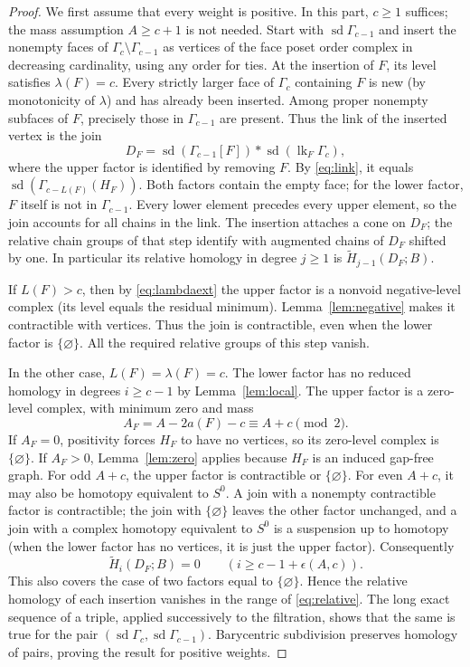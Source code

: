 \documentclass[11pt,a4paper]{article}
\theoremstyle{definition}
\newcommand{\sd}{\operatorname{sd}}
\newcommand{\lk}{\operatorname{lk}}
\newcommand{\Ht}{\widetilde H}
\newcommand{\G}{\Gamma}
\begin{document}
\begin{proof}
We first assume that every weight is positive. In this part, $c\geq1$ suffices; the mass assumption $A\geq c+1$ is not needed. Start with $\sd\G_{c-1}$ and insert the nonempty faces of $\G_c\setminus\G_{c-1}$ as vertices of the face poset order complex in decreasing cardinality, using any order for ties. At the insertion of $F$, its level satisfies $\lambda(F)=c$. Every strictly larger face of $\G_c$ containing $F$ is new (by monotonicity of $\lambda$) and has already been inserted. Among proper nonempty subfaces of $F$, precisely those in $\G_{c-1}$ are present. Thus the link of the inserted vertex is the join
\begin{equation}\label{eq:insert}
 D_F=\sd(\G_{c-1}[F])*\sd(\lk_F\G_c),
\end{equation}
where the upper factor is identified by removing $F$. By \eqref{eq:link}, it equals $\sd(\G_{c-L(F)}(H_F))$. Both factors contain the empty face; for the lower factor, $F$ itself is not in $\G_{c-1}$. Every lower element precedes every upper element, so the join accounts for all chains in the link. The insertion attaches a cone on $D_F$; the relative chain groups of that step identify with augmented chains of $D_F$ shifted by one. In particular its relative homology in degree $j\geq1$ is $\Ht_{j-1}(D_F;B)$.

If $L(F)>c$, then by \eqref{eq:lambdaext} the upper factor is a nonvoid negative-level complex (its level equals the residual minimum). Lemma~\ref{lem:negative} makes it contractible with vertices. Thus the join is contractible, even when the lower factor is $\{\varnothing\}$. All the required relative groups of this step vanish.

In the other case, $L(F)=\lambda(F)=c$. The lower factor has no reduced homology in degrees $i\geq c-1$ by Lemma~\ref{lem:local}. The upper factor is a zero-level complex, with minimum zero and mass
\[
 A_F=A-2a(F)-c\equiv A+c\pmod{2}.
\]
If $A_F=0$, positivity forces $H_F$ to have no vertices, so its zero-level complex is $\{\varnothing\}$. If $A_F>0$, Lemma~\ref{lem:zero} applies because $H_F$ is an induced gap-free graph. For odd $A+c$, the upper factor is contractible or $\{\varnothing\}$. For even $A+c$, it may also be homotopy equivalent to $S^0$. A join with a nonempty contractible factor is contractible; the join with $\{\varnothing\}$ leaves the other factor unchanged, and a join with a complex homotopy equivalent to $S^0$ is a suspension up to homotopy (when the lower factor has no vertices, it is just the upper factor). Consequently
\[
 \Ht_i(D_F;B)=0\qquad(i\geq c-1+\epsilon(A,c)).
\]
This also covers the case of two factors equal to $\{\varnothing\}$. Hence the relative homology of each insertion vanishes in the range of \eqref{eq:relative}. The long exact sequence of a triple, applied successively to the filtration, shows that the same is true for the pair $(\sd\G_c,\sd\G_{c-1})$. Barycentric subdivision preserves homology of pairs, proving the result for positive weights.


\end{proof}
\end{document}
